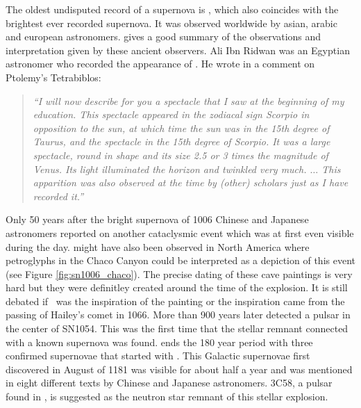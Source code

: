The oldest undisputed record of a supernova is , which also coincides with the brightest ever recorded supernova.  It was observed worldwide by asian, arabic and european astronomers. \citet{1965AJ.....70..105G} gives a good summary of the observations and interpretation given by these ancient observers. Ali Ibn Ridwan was an Egyptian astronomer who recorded the appearance of . He wrote in a comment on Ptolemy's Tetrabiblos: 
\begin{quote}
\textit{``I will now describe for you a spectacle that I saw at the beginning of my education. This spectacle appeared in the zodiacal sign Scorpio in opposition to the sun, at which time the sun was in the 15th degree of Taurus, and the spectacle in the 15th degree of Scorpio. It was a large spectacle, round in shape and its size 2.5 or 3 times the magnitude of Venus. Its light illuminated the horizon and twinkled very much. $\dots$ This apparition was also observed at the time by (other) scholars just as I have recorded it.''}
\end{quote}

Only 50 years after the bright supernova of 1006 Chinese and Japanese astronomers reported on another cataclysmic event which was at first even visible during the day.   might have also been observed in North America where petroglyphs in the Chaco Canyon could be interpreted as a depiction of this event (see Figure \ref{fig:sn1006_chaco}). The precise dating of these cave paintings is very hard but they were definitley created around the time of the  explosion. It is still debated if \ was the inspiration of the painting or the inspiration came from the passing of Hailey's comet in 1066. More than 900 years later \cite{1968Sci...162.1481S} detected a pulsar in the center of SN1054. This was the first time that the stellar remnant connected with a known supernova was found.
 ends the 180 year period with three confirmed supernovae that started with . This Galactic supernovae  first discovered in August of 1181 was visible for about half a year and was mentioned in eight different texts by Chinese and Japanese astronomers. 3C58, a pulsar found in , is suggested as the neutron star remnant of this stellar explosion. 



